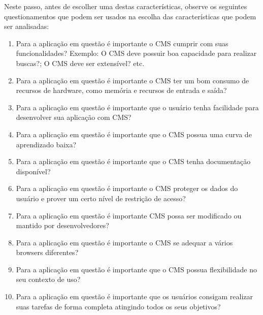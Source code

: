 Neste passo, antes de escolher uma destas características, observe os seguintes questionamentos que podem ser usados na escolha das características que podem ser analisadas:

\begin{enumerate}
\item Para a aplicação em questão é importante o CMS cumprir com suas funcionalidades? Exemplo: O CMS deve possuir boa capacidade para realizar buscas?; O CMS deve ser extensível? etc. 

\item Para a aplicação em questão é importante o CMS ter um bom consumo de recursos de hardware, como memória e recursos de entrada e saída?

\item Para a aplicação em questão é importante que o usuário tenha facilidade para desenvolver sua aplicação com CMS?

\item Para a aplicação em questão é importante que o CMS possua uma curva de aprendizado baixa?

\item Para a aplicação em questão é importante que o CMS tenha documentação disponível?

\item Para a aplicação em questão é importante o CMS proteger os dados do usuário e prover um certo nível de restrição de acesso?

\item Para a aplicação em questão é importante CMS possa ser modificado ou mantido por desenvolvedores?

\item Para a aplicação em questão é importante o CMS se adequar a vários browsers diferentes?

\item Para a aplicação em questão é importante que o CMS possua flexibilidade no seu contexto de uso?

\item Para a aplicação em questão é importante que os usuários consigam realizar suas tarefas de forma completa atingindo todos os seus objetivos?

\end{enumerate}


